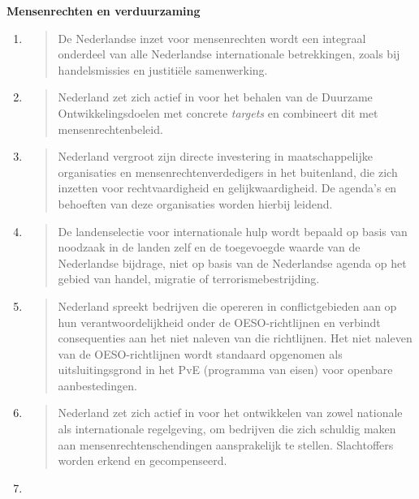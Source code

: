 \textbf{Mensenrechten en verduurzaming}

\begin{enumerate}
\def\labelenumi{\arabic{enumi}.}
\item
  \begin{quote}
  De Nederlandse inzet voor mensenrechten wordt een integraal onderdeel
  van alle Nederlandse internationale betrekkingen, zoals bij
  handelsmissies en justitiële samenwerking.
  \end{quote}
\item
  \begin{quote}
  Nederland zet zich actief in voor het behalen van de Duurzame
  Ontwikkelingsdoelen met concrete \emph{targets} en combineert dit met
  mensenrechtenbeleid.
  \end{quote}
\item
  \begin{quote}
  Nederland vergroot zijn directe investering in maatschappelijke
  organisaties en mensenrechtenverdedigers in het buitenland, die zich
  inzetten voor rechtvaardigheid en gelijkwaardigheid. De agenda's en
  behoeften van deze organisaties worden hierbij leidend.
  \end{quote}
\item
  \begin{quote}
  De landenselectie voor internationale hulp wordt bepaald op basis van
  noodzaak in de landen zelf en de toegevoegde waarde van de Nederlandse
  bijdrage, niet op basis van de Nederlandse agenda op het gebied van
  handel, migratie of terrorismebestrijding.
  \end{quote}
\item
  \begin{quote}
  Nederland spreekt bedrijven die opereren in conflictgebieden aan op
  hun verantwoordelijkheid onder de OESO-richtlijnen en verbindt
  consequenties aan het niet naleven van die richtlijnen. Het niet
  naleven van de OESO-richtlijnen wordt standaard opgenomen als
  uitsluitingsgrond in het PvE (programma van eisen) voor openbare
  aanbestedingen.
  \end{quote}
\item
  \begin{quote}
  Nederland zet zich actief in voor het ontwikkelen van zowel nationale
  als internationale regelgeving, om bedrijven die zich schuldig maken
  aan mensenrechtenschendingen aansprakelijk te stellen. Slachtoffers
  worden erkend en gecompenseerd.
  \end{quote}
\item

\end{enumerate}
